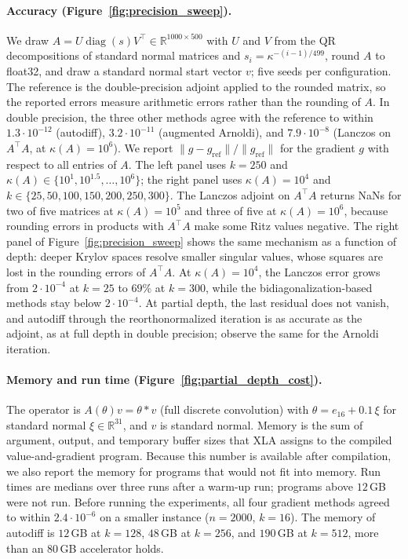 \documentclass[a4paper,12pt]{article}
\theoremstyle{definition}
\begin{document}
\paragraph{Accuracy (Figure~\ref{fig:precision_sweep}).}
We draw $A = U \operatorname{diag}(s) V^\top \in \mathbb{R}^{1000 \times 500}$ with $U$ and $V$ from the QR decompositions of standard normal matrices and $s_i = \kappa^{-(i-1)/499}$, round $A$ to float32, and draw a standard normal start vector $v$; five seeds per configuration. The reference is the double-precision adjoint applied to the rounded matrix, so the reported errors measure arithmetic errors rather than the rounding of $A$. In double precision, the three other methods agree with the reference to within $1.3 \cdot 10^{-12}$ (autodiff), $3.2 \cdot 10^{-11}$ (augmented Arnoldi), and $7.9 \cdot 10^{-8}$ (Lanczos on $A^\top A$, at $\kappa(A) = 10^6$). We report $\|g - g_{\mathrm{ref}}\| / \|g_{\mathrm{ref}}\|$ for the gradient $g$ with respect to all entries of $A$. The left panel uses $k = 250$ and $\kappa(A) \in \{10^1, 10^{1.5}, \ldots, 10^6\}$; the right panel uses $\kappa(A) = 10^4$ and $k \in \{25, 50, 100, 150, 200, 250, 300\}$. The Lanczos adjoint on $A^\top A$ returns NaNs for two of five matrices at $\kappa(A) = 10^5$ and three of five at $\kappa(A) = 10^6$, because rounding errors in products with $A^\top A$ make some Ritz values negative. The right panel of Figure~\ref{fig:precision_sweep} shows the same mechanism as a function of depth: deeper Krylov spaces resolve smaller singular values, whose squares are lost in the rounding errors of $A^\top A$. At $\kappa(A) = 10^4$, the Lanczos error grows from $2 \cdot 10^{-4}$ at $k = 25$ to $69\%$ at $k = 300$, while the bidiagonalization-based methods stay below $2 \cdot 10^{-4}$. At partial depth, the last residual does not vanish, and autodiff through the reorthonormalized iteration is as accurate as the adjoint, as at full depth in double precision; \citet[Table~2]{kraemer2024gradients} observe the same for the Arnoldi iteration.

\paragraph{Memory and run time (Figure~\ref{fig:partial_depth_cost}).}
The operator is $A(\theta) v = \theta * v$ (full discrete convolution) with $\theta = e_{16} + 0.1\, \xi$ for standard normal $\xi \in \mathbb{R}^{31}$, and $v$ is standard normal. Memory is the sum of argument, output, and temporary buffer sizes that XLA assigns to the compiled value-and-gradient program. Because this number is available after compilation, we also report the memory for programs that would not fit into memory. Run times are medians over three runs after a warm-up run; programs above $12$\,GB were not run. Before running the experiments, all four gradient methods agreed to within $2.4 \cdot 10^{-6}$ on a smaller instance ($n = 2000$, $k = 16$). The memory of autodiff is $12$\,GB at $k = 128$, $48$\,GB at $k = 256$, and $190$\,GB at $k = 512$, more than an 80\,GB accelerator holds.
\end{document}
